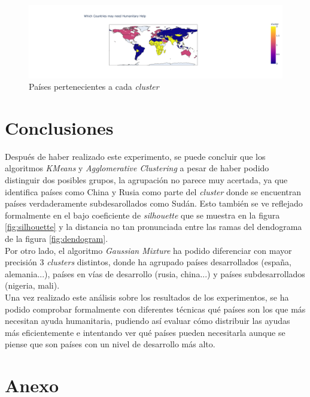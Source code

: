 \documentclass{article}
\begin{document}
\begin{figure}[H]
  \centering
  \includegraphics[width=\linewidth]{../images/gaussian/map.png}
  \caption{Países pertenecientes a cada \textit{cluster}}
  \label{fig:gaussian-map}
\end{figure}

\section{Conclusiones}

\noindent Después de haber realizado este experimento, se puede concluir que los algoritmos \textit{KMeans} y \textit{Agglomerative Clustering} a pesar de haber podido distinguir dos posibles grupos, la agrupación no parece muy acertada, ya que identifica países como China y Rusia como parte del \textit{cluster} donde se encuentran países verdaderamente subdesarollados como Sudán.
Esto también se ve reflejado formalmente en el bajo coeficiente de \textit{silhouette} que se muestra en la figura \ref{fig:silhouette} y la distancia no tan pronunciada entre las ramas del dendograma de la figura \ref{fig:dendogram}.\\

\noindent Por otro lado, el algoritmo \textit{Gaussian Mixture} ha podido diferenciar con mayor precisión 3 \textit{clusters} distintos, donde ha agrupado países desarrollados (españa, alemania...), países en vías de desarrollo (rusia, china...) y países subdesarrollados (nigeria, mali). \\

\noindent Una vez realizado este análisis sobre los resultados de los experimentos, se ha podido comprobar formalmente con diferentes técnicas qué países son los que más necesitan ayuda humanitaria, pudiendo así evaluar cómo distribuir las ayudas más eficientemente e intentando ver qué países pueden necesitarla aunque se piense que son países con un nivel de desarrollo más alto.

\section*{Anexo}
\end{document}
